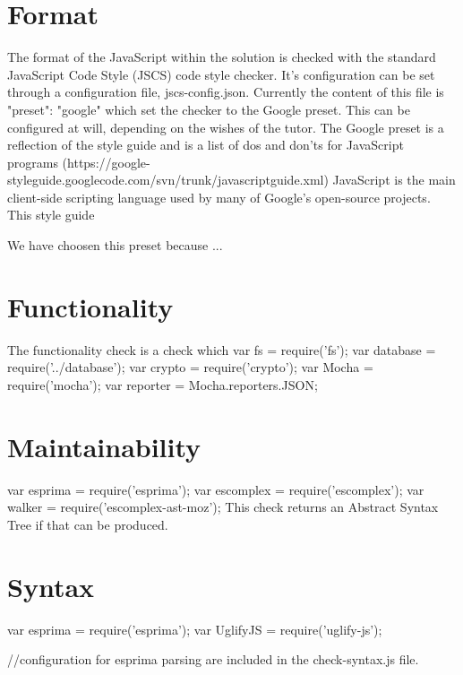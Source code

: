 % 


\section{Format}

The format of the JavaScript within the solution is checked with the standard
JavaScript Code Style (JSCS) code style checker.
It's configuration can be set through a configuration file, jscs-config.json.
Currently the content of this file is {"preset": "google"} which set the checker
to the Google preset.
This can be configured at will, depending on the wishes of the tutor.
The Google preset is a reflection of the style guide and is a list of dos and
don'ts for JavaScript programs
(https://google-styleguide.googlecode.com/svn/trunk/javascriptguide.xml)
JavaScript is the main client-side scripting language used by many of Google's
open-source projects. This style guide 

We have choosen this preset because ...



\section{Functionality}

The functionality check is a check which 
var fs = require('fs');
var database = require('../database');
var crypto = require('crypto');
var Mocha = require('mocha');
var reporter = Mocha.reporters.JSON;






\section{Maintainability}
var esprima = require('esprima');
var escomplex = require('escomplex');
var walker = require('escomplex-ast-moz');
This check returns an Abstract Syntax Tree if that can be produced.


\section{Syntax}
var esprima = require('esprima');
var UglifyJS = require('uglify-js');

//configuration for esprima parsing are included in the check-syntax.js file.

